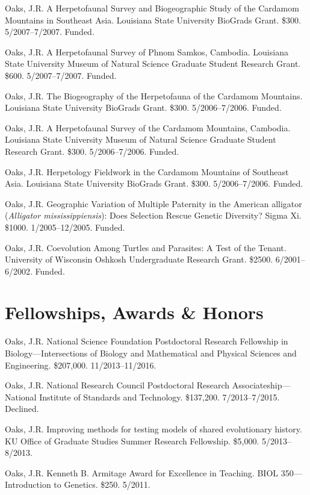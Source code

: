 \documentclass[10pt]{article}
\newcommand{\myHangIndent}{\hangindent=5mm}
\begin{document}
\myHangIndent
Oaks, J.R.
A Herpetofaunal Survey and Biogeographic Study of the Cardamom Mountains in
Southeast Asia.
Louisiana State University BioGrads Grant.
\$300.
5/2007--7/2007.
Funded.

\myHangIndent
Oaks, J.R.
A Herpetofaunal Survey of Phnom Samkos, Cambodia.
Louisiana State University Museum of Natural Science Graduate Student Research
Grant.
\$600.
5/2007--7/2007.
Funded.

\myHangIndent
Oaks, J.R.
The Biogeography of the Herpetofauna of the Cardamom Mountains.
Louisiana State University BioGrads Grant.
\$300.
5/2006--7/2006.
Funded.

\myHangIndent
Oaks, J.R.
A Herpetofaunal Survey of the Cardamom Mountains, Cambodia.
Louisiana State University Museum of Natural Science Graduate Student Research
Grant.
\$300.
5/2006--7/2006.
Funded.

\myHangIndent
Oaks, J.R.
Herpetology Fieldwork in the Cardamom Mountains of Southeast Asia.
Louisiana State University BioGrads Grant.
\$300.
5/2006--7/2006.
Funded.

\myHangIndent
Oaks, J.R.
Geographic Variation of Multiple Paternity in the American alligator
(\emph{Alligator mississippiensis}): Does Selection Rescue Genetic Diversity?
Sigma Xi.
\$1000.
1/2005--12/2005.
Funded.

\myHangIndent
Oaks, J.R.
Coevolution Among Turtles and Parasites: A Test of the Tenant.
University of Wisconsin Oshkosh Undergraduate Research Grant.
\$2500.
6/2001--6/2002.
Funded.

\section*{Fellowships, Awards \& Honors}
\myHangIndent
Oaks, J.R.
National Science Foundation Postdoctoral Research Fellowship in
Biology---Intersections of Biology and Mathematical and Physical Sciences and
Engineering.
\$207,000.
11/2013--11/2016.

\myHangIndent
Oaks, J.R.
National Research Council Postdoctoral Research Associateship---National
Institute of Standards and Technology.
\$137,200.
7/2013--7/2015.
Declined.

\myHangIndent
Oaks, J.R.
Improving methods for testing models of shared evolutionary history.
KU Office of Graduate Studies Summer Research Fellowship.
\$5,000.
5/2013--8/2013.

\myHangIndent
Oaks, J.R.
Kenneth B. Armitage Award for Excellence in Teaching.
BIOL 350---Introduction to Genetics.
\$250.
5/2011.
\end{document}
